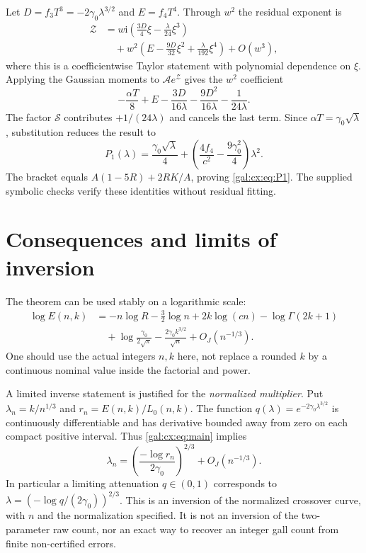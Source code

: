 \documentclass[11pt,letterpaper]{article}
\numberwithin{equation}{section}
\theoremstyle{definition}\newtheorem{definition}[theorem]{Definition}
\theoremstyle{remark}\newtheorem{remark}[theorem]{Remark}
\newcommand{\ii}{\mathrm i}
\newcommand{\Lfix}{L_0(n,k)}
\begin{document}
Let $D=f_3T^3=-2\gamma_0\lambda^{3/2}$ and $E=f_4T^4$. Through $w^2$ the residual exponent is
\begin{equation}\label{gal:cx:eq:P1-exponent}
\begin{aligned}
\mathcal Z
&=w\ii\left(\frac{3D}{4}\xi-\frac{\lambda}{24}\xi^3\right)\\
&\quad+w^2\left(E-\frac{9D}{32}\xi^2+
\frac{\lambda}{192}\xi^4\right)+O(w^3),
\end{aligned}
\end{equation}
where this is a coefficientwise Taylor statement with polynomial dependence on $\xi$. Applying the Gaussian moments to $\mathcal A e^{\mathcal Z}$ gives the $w^2$ coefficient
\begin{equation}\label{gal:cx:eq:P1-before-Stirling}
-\frac{\alpha T}{8}+E-\frac{3D}{16\lambda}
-\frac{9D^2}{16\lambda}-\frac1{24\lambda}.
\end{equation}
The factor $\mathcal S$ contributes $+1/(24\lambda)$ and cancels the last term. Since $\alpha T=\gamma_0\sqrt\lambda$, substitution reduces the result to
\[
P_1(\lambda)=\frac{\gamma_0\sqrt\lambda}{4}
+\left(\frac{4f_4}{c^2}-\frac{9\gamma_0^2}{4}\right)\lambda^2.
\]
The bracket equals $A(1-5R)+2RK/A$, proving \eqref{gal:cx:eq:P1}. The supplied symbolic checks verify these identities without residual fitting.

\section{Consequences and limits of inversion}
The theorem can be used stably on a logarithmic scale:
\begin{equation}\label{gal:cx:eq:logforward}
\begin{aligned}
\log E(n,k)&=-n\log R-\tfrac32\log n+2k\log(cn)
-\log\Gamma(2k+1)\\
&\quad+\log\frac{\gamma_0}{2\sqrt\pi}
-\frac{2\gamma_0k^{3/2}}{\sqrt n}+O_J(n^{-1/3}).
\end{aligned}
\end{equation}
One should use the actual integers $n,k$ here, not replace a rounded $k$ by a continuous nominal value inside the factorial and power.

A limited inverse statement is justified for the \emph{normalized multiplier}. Put $\lambda_n=k/n^{1/3}$ and $r_n=E(n,k)/\Lfix$. The function
$q(\lambda)=e^{-2\gamma_0\lambda^{3/2}}$ is continuously differentiable and has derivative bounded away from zero on each compact positive interval. Thus \eqref{gal:cx:eq:main} implies
\begin{equation}\label{gal:cx:eq:inverse}
\lambda_n=\left(\frac{-\log r_n}{2\gamma_0}\right)^{2/3}
+O_J(n^{-1/3}).
\end{equation}
In particular a limiting attenuation $q\in(0,1)$ corresponds to
$\lambda=(-\log q/(2\gamma_0))^{2/3}$. This is an inversion of the normalized crossover curve, with $n$ and the normalization specified. It is not an inversion of the two-parameter raw count, nor an exact way to recover an integer gall count from finite non-certified errors.
\end{document}
